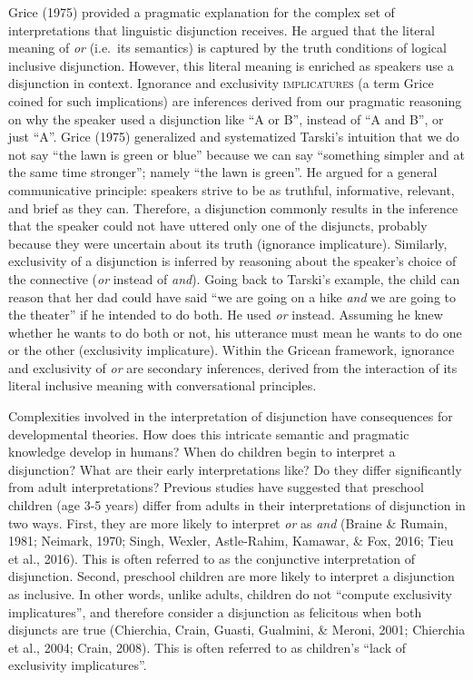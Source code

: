 \documentclass[,man,floatsintext]{apa6}
\begin{document}
Grice (1975) provided a pragmatic explanation for the complex set of interpretations that linguistic disjunction receives. He argued that the literal meaning of \emph{or} (i.e.~its semantics) is captured by the truth conditions of logical inclusive disjunction. However, this literal meaning is enriched as speakers use a disjunction in context. Ignorance and exclusivity \textsc{implicatures} (a term Grice coined for such implications) are inferences derived from our pragmatic reasoning on why the speaker used a disjunction like \enquote{A or B}, instead of \enquote{A and B}, or just \enquote{A}. Grice (1975) generalized and systematized Tarski's intuition that we do not say \enquote{the lawn is green or blue} because we can say \enquote{something simpler and at the same time stronger}; namely \enquote{the lawn is green}. He argued for a general communicative principle: speakers strive to be as truthful, informative, relevant, and brief as they can. Therefore, a disjunction commonly results in the inference that the speaker could not have uttered only one of the disjuncts, probably because they were uncertain about its truth (ignorance implicature). Similarly, exclusivity of a disjunction is inferred by reasoning about the speaker's choice of the connective (\emph{or} instead of \emph{and}). Going back to Tarski's example, the child can reason that her dad could have said \enquote{we are going on a hike \emph{and} we are going to the theater} if he intended to do both. He used \emph{or} instead. Assuming he knew whether he wants to do both or not, his utterance must mean he wants to do one or the other (exclusivity implicature). Within the Gricean framework, ignorance and exclusivity of \emph{or} are secondary inferences, derived from the interaction of its literal inclusive meaning with conversational principles.

Complexities involved in the interpretation of disjunction have consequences for developmental theories. How does this intricate semantic and pragmatic knowledge develop in humans? When do children begin to interpret a disjunction? What are their early interpretations like? Do they differ significantly from adult interpretations? Previous studies have suggested that preschool children (age 3-5 years) differ from adults in their interpretations of disjunction in two ways. First, they are more likely to interpret \emph{or} as \emph{and} (Braine \& Rumain, 1981; Neimark, 1970; Singh, Wexler, Astle-Rahim, Kamawar, \& Fox, 2016; Tieu et al., 2016). This is often referred to as the conjunctive interpretation of disjunction. Second, preschool children are more likely to interpret a disjunction as inclusive. In other words, unlike adults, children do not \enquote{compute exclusivity implicatures}, and therefore consider a disjunction as felicitous when both disjuncts are true (Chierchia, Crain, Guasti, Gualmini, \& Meroni, 2001; Chierchia et al., 2004; Crain, 2008). This is often referred to as children's \enquote{lack of exclusivity implicatures}.
\end{document}
